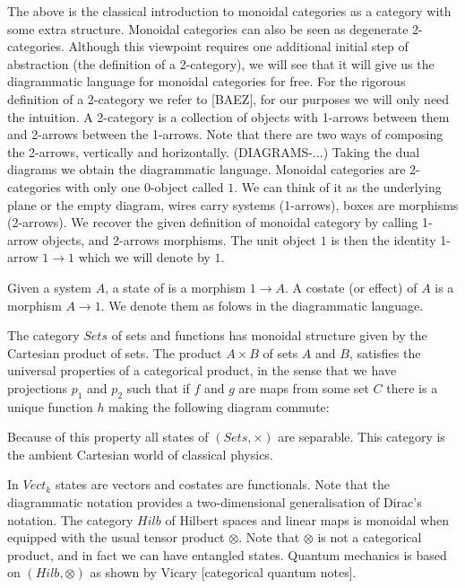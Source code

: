 \documentclass{article}
\newenvironment{definition}[1][Definition]{\begin{trivlist}
\item[\hskip \labelsep {\bfseries #1}]}{\end{trivlist}}
\newenvironment{example}[1][Example]{\begin{trivlist}
\item[\hskip \labelsep {\bfseries #1}]}{\end{trivlist}}
\begin{document}
The above is the classical introduction to monoidal categories as a category with some extra structure. Monoidal categories can also be seen as degenerate 2-categories. Although this viewpoint requires one additional initial step of abstraction (the definition of a 2-category), we will see that it will give us the diagrammatic language for monoidal categories for free. For the rigorous definition of a 2-category we refer to [BAEZ], for our purposes we will only need the intuition. A 2-category is a collection of objects with 1-arrows between them and 2-arrows between the 1-arrows. Note that there are two ways of composing the 2-arrows, vertically and horizontally. (DIAGRAMS-...) Taking the dual diagrams we obtain the diagrammatic language. Monoidal categories are 2-categories with only one 0-object called $1$. We can think of it as the underlying plane or the empty diagram, wires carry systems (1-arrows), boxes are morphisms (2-arrows). We recover the given definition of monoidal category by calling 1-arrow objects, and 2-arrows morphisms. The unit object $1$ is then the identity 1-arrow $1 \rightarrow 1$ which we will denote by $1$. 
\begin{definition}
Given a system $A$, a state of is a morphism $1 \rightarrow A$. A costate (or effect) of $A$ is a morphism $A \rightarrow 1$. We denote them as folows in the diagrammatic language.
\end{definition}
\begin{example}
The category $Sets$ of sets and functions has monoidal structure given by the Cartesian product of sets. The product $A \times B$ of sets $A$ and $B$, satisfies the universal properties of a categorical product, in the sense that we have projections $p_1$ and $p_2$ such that if $f$ and $g$ are maps from some set $C$ there is a unique function $h$ making the following diagram commute:
\begin{center}
\end{center}
Because of this property all states of $(Sets,\times)$ are separable. This category is the ambient Cartesian world of classical physics.
\end{example}
\begin{example}
In $Vect_k$ states are vectors and costates are functionals. Note that the diagrammatic notation provides a two-dimensional generalisation of Dirac's notation. The category $Hilb$ of Hilbert spaces and linear maps is monoidal when equipped with the usual tensor product $\otimes$. Note that $\otimes$ is not a categorical product, and in fact we can have entangled states. Quantum mechanics is based on $(Hilb, \otimes)$ as shown by Vicary [categorical quantum notes].
\end{example}
\end{document}
